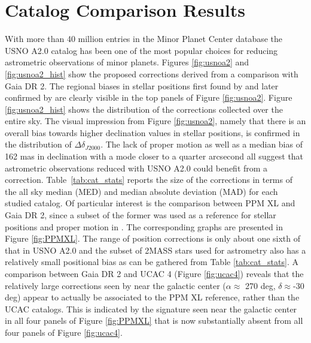 \documentclass[review]{elsarticle}
\begin{document}
\section{Catalog Comparison Results}
With more than 40 million entries in the Minor Planet Center database the USNO A2.0 catalog has been one of the most popular choices for reducing astrometric observations of minor planets.
Figures \ref{fig:usnoa2} and \ref{fig:usnoa2_hist} show the proposed corrections derived from a comparison with Gaia DR 2.
The regional biases in stellar positions first found by \citet{chesley10} and later confirmed by \citet{farnocchia15} are clearly visible in the top panels of Figure \ref{fig:usnoa2}.
%
Figure \ref{fig:usnoa2_hist} shows the distribution of the corrections collected over the entire sky. The visual impression from Figure \ref{fig:usnoa2}, namely that there is an overall bias towards higher declination values in stellar positions, is confirmed in the distribution of $\Delta \delta_{J2000}$. The lack of proper motion as well as a median bias of 162 mas in declination with a mode closer to a quarter arcsecond all suggest that astrometric observations reduced with USNO A2.0 could benefit from a correction. 
%
Table~\ref{tab:cat_stats} reports the size of the corrections in terms of the all sky median (MED) and median absolute deviation (MAD) for each studied catalog. 
%
Of particular interest is the comparison between PPM XL and Gaia DR 2, since a subset of the former was used as a reference for stellar positions and proper motion in \citet{farnocchia15}.
The corresponding graphs are presented in Figure \ref{fig:PPMXL}.
The range of position corrections is only about one sixth of that in USNO A2.0 and the subset of 2MASS stars used for astrometry also has a relatively small positional bias as can be gathered from Table \ref{tab:cat_stats}.
%
A comparison between Gaia DR 2 and UCAC 4 (Figure \ref{fig:ucac4}) reveals that
the relatively large corrections seen by \citet[][Figures 9 to 12]{farnocchia15} near the galactic center ($\alpha\approx$ 270 deg, $\delta\approx$-30 deg) appear to actually be associated to the PPM XL reference, rather than the UCAC catalogs. This is indicated by the signature seen near the galactic center in all four panels of Figure \ref{fig:PPMXL} that is now substantially absent from all four panels of Figure \ref{fig:ucac4}.

%
\end{document}
